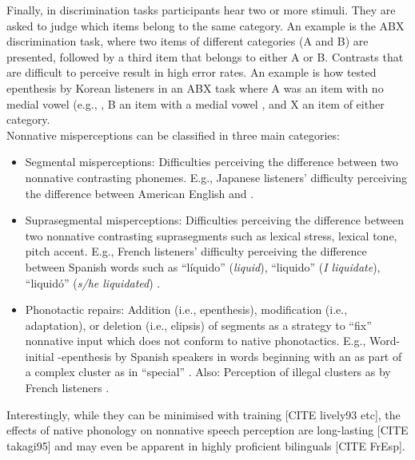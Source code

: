 Finally, in discrimination tasks participants hear two or more stimuli. They are asked to judge which items belong to the same category. An example is the ABX discrimination task, where two items of different categories (A and B) are presented, followed by a third item that belongs to either A or B. Contrasts that are difficult to perceive result in high error rates. An example is how \cite{durvasula2015} tested epenthesis by Korean listeners in an ABX task where A was an item with no medial vowel (e.g., , B an item with a medial vowel , and X an item of either category.     \\  

Nonnative misperceptions can be classified in three main categories:

\begin{itemize}
\item Segmental misperceptions: Difficulties perceiving the difference between two nonnative contrasting phonemes. E.g., Japanese listeners' difficulty perceiving the difference between American English  and  \cite{goto1991, miyawaki1981}.
\item Suprasegmental misperceptions: Difficulties perceiving the difference between two nonnative contrasting suprasegments such as lexical stress, lexical tone, pitch accent. E.g., French listeners' difficulty perceiving the difference between Spanish words such as ``líquido''  (\textit{liquid}), ``liquido''  (\textit{I liquidate}), ``liquidó''  (\textit{s/he liquidated}) \cite{dupoux1997, dupoux2008}.
\item Phonotactic repairs: Addition (i.e., epenthesis), modification (i.e., adaptation), or deletion (i.e., elipsis) of segments as a strategy to ``fix'' nonnative input which does not conform to native phonotactics. E.g., Word-initial -epenthesis by Spanish speakers in words beginning with an  as part of a complex cluster as in ``special'' \cite{halle2014}. Also: Perception of illegal  clusters as  by French listeners \cite{halle2007}.  
\end{itemize}

Interestingly, while they can be minimised with training [CITE lively93 etc], the effects of native phonology on nonnative speech perception are long-lasting [CITE takagi95] and may even be apparent in highly proficient bilinguals [CITE FrEsp].


